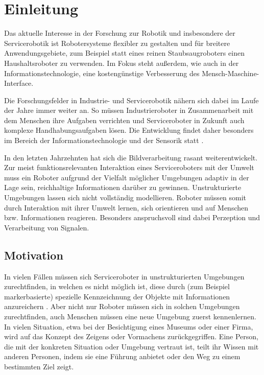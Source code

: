 
\chapter{Einleitung}
\label{einleitung_cha}
\authorsection{\editorabel}

Das aktuelle Interesse in der Forschung zur Robotik und insbesondere der Servicerobotik ist Robotersysteme flexibler zu gestalten und für breitere Anwendungsgebiete, zum Beispiel statt eines reinen Staubsaugroboters einen Haushaltsroboter zu verwenden.
Im Fokus steht außerdem, wie auch in der Informationstechnologie, eine kostengünstige Verbesserung des Mensch-Maschine-Interface\cite{kinect_1}.

Die Forschungsfelder in Industrie- und Servicerobotik nähern sich dabei im Laufe der Jahre immer weiter an.
So müssen Industrieroboter in Zusammenarbeit mit dem Menschen ihre Aufgaben verrichten und Serviceroboter in Zukunft auch komplexe Handhabungsaufgaben lösen.
Die Entwicklung findet daher besonders im Bereich der Informationstechnologie und der Sensorik statt  \cite{kinect_2}.

In den letzten Jahrzehnten hat sich die Bildverarbeitung rasant weiterentwickelt.
Zur meist funktionsrelevanten Interaktion eines Serviceroboters mit der Umwelt muss ein Roboter aufgrund der Vielfalt möglicher Umgebungen adaptiv in der Lage sein, reichhaltige Informationen darüber zu gewinnen.
Unstrukturierte Umgebungen lassen sich nicht vollständig modellieren.
Roboter müssen somit durch Interaktion mit ihrer Umwelt lernen, sich orientieren und auf Menschen bzw. Informationen reagieren.
Besonders anspruchsvoll sind dabei Perzeption und Verarbeitung von Signalen.




\section{Motivation}
\label{motivation_real_sec}
\authorsection{\editorjulian, \editortobias}


In vielen Fällen müssen sich Serviceroboter in unstrukturierten Umgebungen zurechtfinden, in welchen es nicht möglich ist, diese durch (zum Beispiel markerbasierte) spezielle Kennzeichnung der Objekte mit Informationen anzureichern \citep{sturm10rss-workshop}.
Aber nicht nur Roboter müssen sich in solchen Umgebungen zurechtfinden, auch Menschen müssen eine neue Umgebung zuerst kennenlernen.
In vielen Situation, etwa bei der Besichtigung eines Museums oder einer Firma, wird auf das Konzept des Zeigens oder Vormachens zurückgegriffen.
Eine Person, die mit der konkreten Situation oder Umgebung vertraut ist, teilt ihr Wissen mit anderen Personen, indem sie eine Führung anbietet oder den Weg zu einem bestimmten Ziel zeigt.

